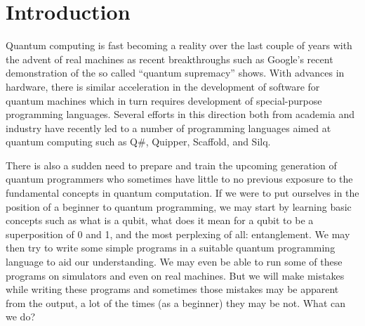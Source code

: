 \documentclass[adraft,creativecommons]{eptcs}
\title{\titlerunning}
\author{
\authorrunning
\institute{University of Chicago}
\email{\mailtodomain{ks@cs.uchicago.edu}}
}
\theoremstyle{definition}
\theoremstyle{remark}
\begin{document}
\maketitle

\begin{abstract}
    As quantum computers become real, it is high time we come up with effective techniques that help programmers write correct quantum programs. In classical computing, formal verification and sound static type systems prevent several classes of bugs from being introduced. There is a need for similar techniques in the quantum regime. Inspired by Hoare Type Theory in the classical paradigm, we propose Quantum Hoare Types by extending the Quantum IO Monad by indexing it with pre- and postconditions that serve as program specifications. In this paper, we introduce Quantum Hoare Type Theory (QHTT), present its syntax and typing rules, and demonstrate its effectiveness with the help of examples.

    QHTT has the potential to be a unified system for programming, specifying, and reasoning about quantum programs.
\end{abstract}

\thispagestyle{empty}

\tableofcontents

\listoftables

\listoffigures

\lstlistoflistings

\section{Introduction}

Quantum computing is fast becoming a reality over the last couple of years with the advent of real machines as recent breakthroughs such as Google's recent demonstration of the so called ``quantum supremacy'' shows. With advances in hardware, there is similar acceleration in the development of software for quantum machines which in turn requires development of special-purpose programming languages. Several efforts in this direction both from academia and industry have recently led to a number of programming languages aimed at quantum computing such as Q\#, Quipper, Scaffold, and Silq.

There is also a sudden need to prepare and train the upcoming generation of quantum programmers who sometimes have little to no previous exposure to the fundamental concepts in quantum computation. If we were to put ourselves in the position of a beginner to quantum programming, we may start by learning basic concepts such as what is a qubit, what does it mean for a qubit to be a superposition of 0 and 1, and the most perplexing of all: entanglement. We may then try to write some simple programs in a suitable quantum programming language to aid our understanding. We may even be able to run some of these programs on simulators and even on real machines. But we will make mistakes while writing these programs and sometimes those mistakes may be apparent from the output, a lot of the times (as a beginner) they may be not. What can we do?
\end{document}

